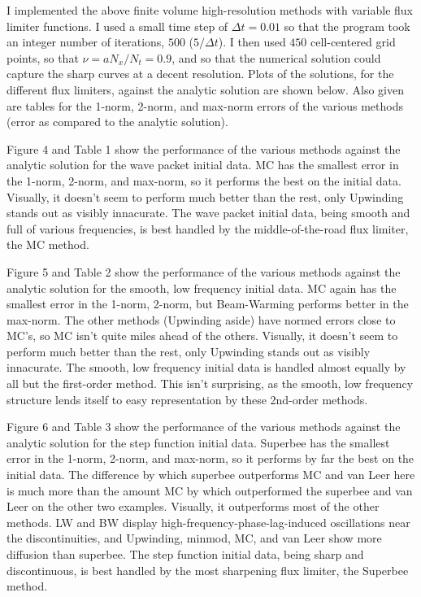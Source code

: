 \documentclass[12pt]{article}
\begin{document}
I implemented the above finite volume high-resolution methods with variable flux limiter functions.  I used a small time step of $\Delta t = 0.01$ so that the program took an integer number of iterations, $500$ ($5/\Delta t$).  I then used $450$ cell-centered grid points, so that $\nu=a N_x / N_t = 0.9$, and so that the numerical solution could capture the sharp curves at a decent resolution.  Plots of the solutions, for the different flux limiters, against the analytic solution are shown below.  Also given are tables for the 1-norm, 2-norm, and max-norm errors of the various methods (error as compared to the analytic solution).

Figure 4 and Table 1 show the performance of the various methods against the analytic solution for the wave packet initial data.  MC has the smallest error in the 1-norm, 2-norm, and max-norm, so it performs the best on the initial data.  Visually, it doesn't seem to perform much better than the rest, only Upwinding stands out as visibly innacurate.  The wave packet initial data, being smooth and full of various frequencies, is best handled by the middle-of-the-road flux limiter, the MC method.

Figure 5 and Table 2 show the performance of the various methods against the analytic solution for the smooth, low frequency initial data.  MC again has the smallest error in the 1-norm, 2-norm, but Beam-Warming performs better in the max-norm. The other methods (Upwinding aside) have normed errors close to MC's, so MC isn't quite miles ahead of the others.  Visually, it doesn't seem to perform much better than the rest, only Upwinding stands out as visibly innacurate.  The smooth, low frequency initial data is handled almost equally by all but the first-order method.  This isn't surprising, as the smooth, low frequency structure lends itself to easy representation by these 2nd-order methods.

Figure 6 and Table 3 show the performance of the various methods against the analytic solution for the step function initial data.  Superbee has the smallest error in the 1-norm, 2-norm, and max-norm, so it performs by far the best on the initial data.  The difference by which superbee outperforms MC and van Leer here is much more than the amount MC by which outperformed the superbee and van Leer on the other two examples. Visually, it outperforms most of the other methods. LW and BW display high-frequency-phase-lag-induced oscillations near the discontinuities, and Upwinding, minmod, MC, and van Leer show more diffusion than superbee.  The step function initial data, being sharp and discontinuous, is best handled by the most sharpening flux limiter, the Superbee method.
\end{document}
